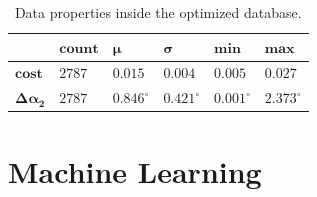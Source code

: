 \documentclass[11pt,a4paper,twocolumn]{article}
\begin{document}
\begin{table}[!h]  
    \centering
    \renewcommand{\arraystretch}{2}
    \caption{Data properties inside the optimized database.}
    \label{tab:filteredDatabase}
    \begin{tabularx}{0.45\textwidth} { 
        | >{\centering\arraybackslash}X 
         >{\centering\arraybackslash}X 
         >{\centering\arraybackslash}X
         >{\centering\arraybackslash}X
         >{\centering\arraybackslash}X
         >{\centering\arraybackslash}X | } 
        \hline
                                       & $\boldsymbol{count}$ & $\boldsymbol{\mu}$ & $\boldsymbol{\sigma}$ & $\boldsymbol{min}$ & $\boldsymbol{max}$ \\ \hline\hline
        $\boldsymbol{cost}$            & $2787$               & $0.015$         & $0.004$            & $0.005$         & $0.027$         \\ \hline
        $\boldsymbol{\Delta \alpha_2}$ & $2787$               & $0.846^\circ$   & $0.421^\circ$      & $0.001^\circ$   & $2.373^\circ$   \\ \hline
    \end{tabularx}
\end{table}

\section{Machine Learning}


\end{document}
